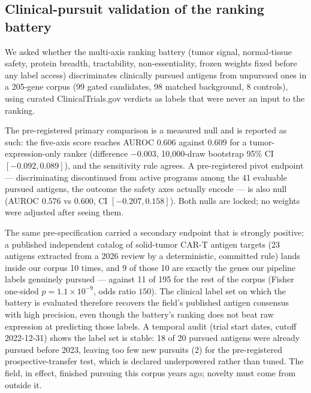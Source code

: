\documentclass[11pt]{article}
\begin{document}
\subsection{Clinical-pursuit validation of the ranking battery}
We asked whether the multi-axis ranking battery (tumor signal, normal-tissue
safety, protein breadth, tractability, non-essentiality, frozen weights fixed
before any label access) discriminates clinically pursued antigens from
unpursued ones in a 205-gene corpus (99 gated candidates, 98 matched background,
8 controls), using curated ClinicalTrials.gov verdicts as labels that were
never an input to the ranking.

The pre-registered primary comparison is a measured null and is reported as
such: the five-axis score reaches AUROC $0.606$ against $0.609$ for a
tumor-expression-only ranker (difference $-0.003$, 10{,}000-draw bootstrap 95\%
CI $[-0.092, 0.089]$), and the sensitivity rule agrees. A pre-registered pivot
endpoint --- discriminating discontinued from active programs among the 41
evaluable pursued antigens, the outcome the safety axes actually encode --- is
also null (AUROC $0.576$ vs $0.600$, CI $[-0.207, 0.158]$). Both nulls are
locked; no weights were adjusted after seeing them.

The same pre-specification carried a secondary endpoint that is strongly
positive: a published independent catalog of solid-tumor CAR-T antigen targets
(23 antigens extracted from a 2026 review by a deterministic, committed rule)
lands inside our corpus 10 times, and 9 of those 10 are exactly the genes our
pipeline labels genuinely pursued --- against 11 of 195 for the rest of the
corpus (Fisher one-sided $p=1.1\times10^{-9}$, odds ratio $150$). The clinical
label set on which the battery is evaluated therefore recovers the field's
published antigen consensus with high precision, even though the battery's
ranking does not beat raw expression at predicting those labels. A temporal
audit (trial start dates, cutoff 2022-12-31) shows the label set is stable:
18 of 20 pursued antigens were already pursued before 2023, leaving too few
new pursuits (2) for the pre-registered prospective-transfer test, which is
declared underpowered rather than tuned. The field, in effect, finished
pursuing this corpus years ago; novelty must come from outside it.
\end{document}
